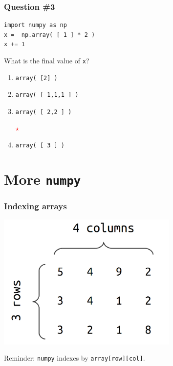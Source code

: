 \documentclass[11pt]{beamer}
\newcommand{\correctstar}{\textcolor{red}{$\star$}}
\begin{document}
\begin{frame}[fragile]
  \frametitle{Question \#3}
  \Enlarge

  \begin{Verbatim}
import numpy as np
x =  np.array( [ 1 ] * 2 )
x += 1
  \end{Verbatim}

  What is the final value of \texttt{x}?

  \begin{enumerate}[label=\Alph*]
  \item
  \begin{Verbatim}
array( [2] )
  \end{Verbatim}
  \item
  \begin{Verbatim}
array( [ 1,1,1 ] )
  \end{Verbatim}
  \item
  \begin{Verbatim}
array( [ 2,2 ] )
  \end{Verbatim}
  \correctstar
  \item
  \begin{Verbatim}
array( [ 3 ] )
  \end{Verbatim}
  \end{enumerate}
\end{frame}

\section{More \texttt{numpy}}

\begin{frame}[fragile]
  \frametitle{Indexing arrays}
  \Enlarge

  \includegraphics[width=0.67\textwidth]{./img/ndarray.png}

  \begin{enumerate}
  \myitem  Reminder:  \texttt{numpy} indexes by \texttt{array[row][col]}.
  \end{enumerate}
\end{frame}
\end{document}
